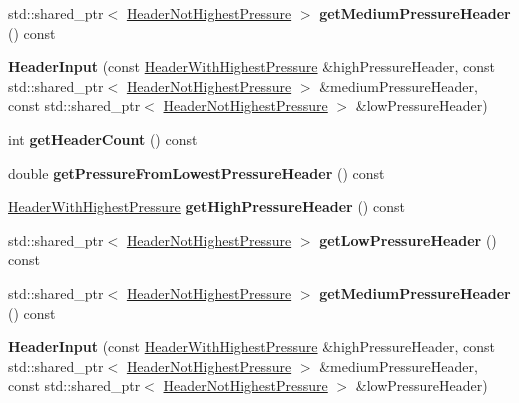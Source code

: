 \begin{DoxyCompactItemize}
std\+::shared\+\_\+ptr$<$ \hyperlink{class_header_not_highest_pressure}{Header\+Not\+Highest\+Pressure} $>$ {\bfseries get\+Medium\+Pressure\+Header} () const
\item 
\mbox{\label{class_header_input_a52a39183b1823fcb57347f607967cf64}} 
{\bfseries Header\+Input} (const \hyperlink{class_header_with_highest_pressure}{Header\+With\+Highest\+Pressure} \&high\+Pressure\+Header, const std\+::shared\+\_\+ptr$<$ \hyperlink{class_header_not_highest_pressure}{Header\+Not\+Highest\+Pressure} $>$ \&medium\+Pressure\+Header, const std\+::shared\+\_\+ptr$<$ \hyperlink{class_header_not_highest_pressure}{Header\+Not\+Highest\+Pressure} $>$ \&low\+Pressure\+Header)
\item 
\mbox{\label{class_header_input_a45e461a0eca1df691fe13f6f9b1968fe}} 
int {\bfseries get\+Header\+Count} () const
\item 
\mbox{\label{class_header_input_a820d9ed7adc49098eeca8af3694f91ee}} 
double {\bfseries get\+Pressure\+From\+Lowest\+Pressure\+Header} () const
\item 
\mbox{\label{class_header_input_a298d0336874b64566c6abdc05639df20}} 
\hyperlink{class_header_with_highest_pressure}{Header\+With\+Highest\+Pressure} {\bfseries get\+High\+Pressure\+Header} () const
\item 
\mbox{\label{class_header_input_a3e23a733f6dfd723db64a37ef2d62a23}} 
std\+::shared\+\_\+ptr$<$ \hyperlink{class_header_not_highest_pressure}{Header\+Not\+Highest\+Pressure} $>$ {\bfseries get\+Low\+Pressure\+Header} () const
\item 
\mbox{\label{class_header_input_ae2bc38a82e48be3bc61732b152e47c68}} 
std\+::shared\+\_\+ptr$<$ \hyperlink{class_header_not_highest_pressure}{Header\+Not\+Highest\+Pressure} $>$ {\bfseries get\+Medium\+Pressure\+Header} () const
\item 
\mbox{\label{class_header_input_a52a39183b1823fcb57347f607967cf64}} 
{\bfseries Header\+Input} (const \hyperlink{class_header_with_highest_pressure}{Header\+With\+Highest\+Pressure} \&high\+Pressure\+Header, const std\+::shared\+\_\+ptr$<$ \hyperlink{class_header_not_highest_pressure}{Header\+Not\+Highest\+Pressure} $>$ \&medium\+Pressure\+Header, const std\+::shared\+\_\+ptr$<$ \hyperlink{class_header_not_highest_pressure}{Header\+Not\+Highest\+Pressure} $>$ \&low\+Pressure\+Header)

\end{DoxyCompactItemize}
